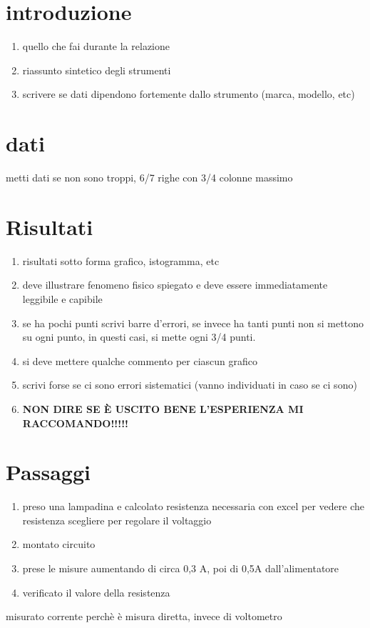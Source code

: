 \documentclass[a4paper]{article}
\begin{document}
\section{introduzione}
\begin{enumerate}
   \item quello che fai durante la relazione
   \item riassunto sintetico degli strumenti
   \item scrivere se dati dipendono fortemente dallo strumento (marca, modello, etc)
\end{enumerate}

\section{dati}
metti dati se non sono troppi, 6/7 righe con 3/4 colonne massimo

\section{Risultati}
\begin{enumerate}
   \item risultati sotto forma grafico, istogramma, etc
   \item deve illustrare fenomeno fisico spiegato e deve essere immediatamente leggibile e capibile
   \item se ha pochi punti scrivi barre d'errori, se invece ha tanti punti non si mettono su ogni punto, in questi casi, si mette ogni 3/4 punti. 
   \item si deve mettere qualche commento per ciascun grafico
   \item scrivi forse se ci sono errori sistematici (vanno individuati in caso se ci sono)
   \item \textbf{NON DIRE SE È USCITO BENE L'ESPERIENZA MI RACCOMANDO!!!!!}
\end{enumerate}

\section{Passaggi}
\begin{enumerate}
   \item preso una lampadina e calcolato resistenza necessaria con excel per vedere che resistenza scegliere per regolare il voltaggio
   \item montato circuito
   \item prese le misure aumentando di circa 0,3 A, poi di 0,5A dall'alimentatore
   \item verificato il valore della resistenza
\end{enumerate}

misurato corrente perchè è misura diretta, invece di voltometro
\end{document}
